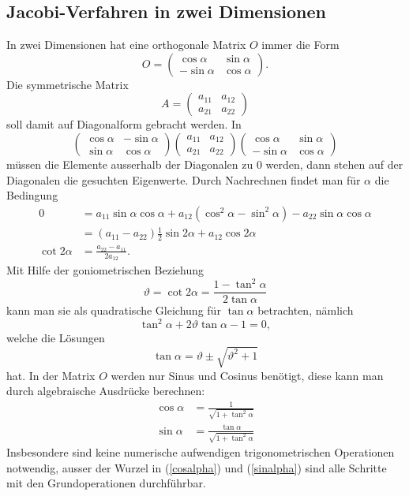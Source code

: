 \subsection{Jacobi-Verfahren in zwei Dimensionen\label{jacobi2d}}
In zwei Dimensionen hat eine orthogonale Matrix $O$ immer die
Form
\[
O=\begin{pmatrix}\cos\alpha&\sin\alpha\\-\sin\alpha&\cos\alpha\end{pmatrix}.
\]
Die symmetrische Matrix
\[
A=\begin{pmatrix}a_{11}&a_{12}\\a_{21}&a_{22}\end{pmatrix}
\]
soll damit auf Diagonalform gebracht werden.
In
\[
\begin{pmatrix}
\cos\alpha&-\sin\alpha\\
\sin\alpha& \cos\alpha
\end{pmatrix}
\begin{pmatrix}
a_{11}&a_{12}\\
a_{21}&a_{22}
\end{pmatrix}
\begin{pmatrix}
 \cos\alpha&\sin\alpha\\
-\sin\alpha&\cos\alpha
\end{pmatrix}
\]
müssen die Elemente ausserhalb der Diagonalen zu $0$ werden, dann
stehen auf der Diagonalen die gesuchten Eigenwerte.
Durch Nachrechnen findet man für $\alpha$ die Bedingung
\begin{align*}
0&=
a_{11}\sin\alpha\cos\alpha +a_{12}(\cos^2\alpha-\sin^2\alpha)
-a_{22}\sin\alpha\cos\alpha
\\
&=
(a_{11}-a_{22})
\frac12\sin2\alpha+a_{12}\cos2\alpha\\
\cot2\alpha&=\frac{a_{22}-a_{11}}{2a_{12}}.
\end{align*}
Mit Hilfe der goniometrischen Beziehung
\[
\vartheta=\cot2\alpha = \frac{1-\tan^2\alpha}{2\tan\alpha}
\]
kann man sie als quadratische Gleichung für $\tan\alpha$ betrachten, nämlich
\[
\tan^2\alpha+2\vartheta\tan\alpha-1=0,
\]
welche die Lösungen
\[
\tan\alpha=\vartheta\pm\sqrt{\vartheta^2+1}
\]
hat. In der Matrix $O$ werden nur Sinus und Cosinus benötigt, diese
kann man durch algebraische Ausdrücke berechnen:
\begin{align}
\cos\alpha&=\frac1{\sqrt{1+\tan^2\alpha}}\label{cosalpha}\\
\sin\alpha&=\frac{\tan\alpha}{\sqrt{1+\tan^2\alpha}}\label{sinalpha}
\end{align}
Insbesondere sind keine numerische aufwendigen trigonometrischen Operationen
notwendig, ausser der Wurzel in (\ref{cosalpha}) und (\ref{sinalpha})
sind alle Schritte mit den Grundoperationen durchführbar.

